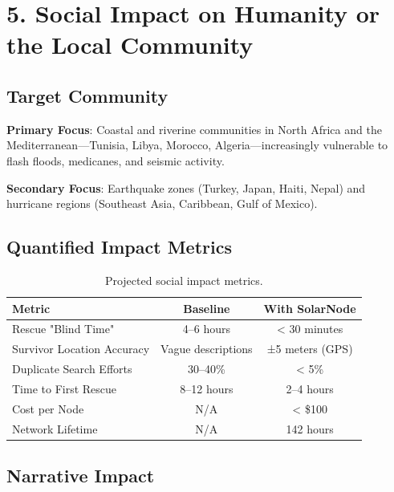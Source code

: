 \documentclass[12pt,a4paper]{article}
\begin{document}
\section*{5. Social Impact on Humanity or the Local Community}

\subsection*{Target Community}

\textbf{Primary Focus}: Coastal and riverine communities in North Africa and the Mediterranean—Tunisia, Libya, Morocco, Algeria—increasingly vulnerable to flash floods, medicanes, and seismic activity.

\textbf{Secondary Focus}: Earthquake zones (Turkey, Japan, Haiti, Nepal) and hurricane regions (Southeast Asia, Caribbean, Gulf of Mexico).

\subsection*{Quantified Impact Metrics}

\begin{table}[H]
\centering
\begin{tabular}{@{}l c c@{}}
\toprule
\textbf{Metric} & \textbf{Baseline} & \textbf{With SolarNode} \\
\midrule
Rescue "Blind Time" & 4–6 hours & < 30 minutes \\
Survivor Location Accuracy & Vague descriptions & ±5 meters (GPS) \\
Duplicate Search Efforts & 30–40\% & < 5\% \\
Time to First Rescue & 8–12 hours & 2–4 hours \\
Cost per Node & N/A & < \$100 \\
Network Lifetime & N/A & 142 hours \\
\bottomrule
\end{tabular}
\caption{Projected social impact metrics.}
\label{tab:social_impact}
\end{table}

\subsection*{Narrative Impact}
\end{document}
